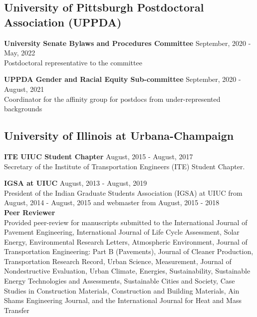 \documentclass[12pt]{article}
\begin{document}
\subsection*{University of Pittsburgh Postdoctoral Association (UPPDA)}
\textbf{University Senate Bylaws and Procedures Committee} \hfill September, 2020 - May, 2022 \\
Postdoctoral representative to the committee

\textbf{UPPDA Gender and Racial Equity Sub-committee} \hfill September, 2020 - August, 2021 \\
Coordinator for the affinity group for postdocs from under-represented backgrounds \\

\subsection*{University of Illinois at Urbana-Champaign} 
\textbf{ITE UIUC Student Chapter} \hfill August, 2015 - August, 2017 \\
Secretary of the Institute of Transportation Engineers (ITE) Student Chapter. 

\textbf{IGSA at UIUC} \hfill August, 2013 - August, 2019 \\
President of the Indian Graduate Students Association (IGSA) at UIUC from August, 2014 - August, 2015 and webmaster from August, 2015 - 2018 \\

\textbf{Peer Reviewer} \\
Provided peer-review for manuscripts submitted to the International Journal of Pavement Engineering, International Journal of Life Cycle Assessment, Solar Energy, Environmental Research Letters, Atmospheric Environment, Journal of Transportation Engineering: Part B (Pavements), Journal of Cleaner Production, Transportation Research Record, Urban Science, Measurement, Journal of Nondestructive Evaluation, Urban Climate, Energies, Sustainability, Sustainable Energy Technologies and Assessments, Sustainable Cities and Society, Case Studies in Construction Materials, Construction and Building Materials, Ain Shams Engineering Journal, and the International Journal for Heat and Mass Transfer \\
\end{document}
